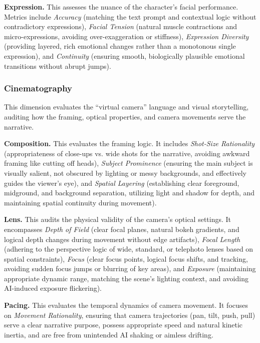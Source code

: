 \documentclass{article}
\begin{document}
\noindent
\textbf{Expression.} This assesses the nuance of the character's facial performance. Metrics include \textit{Accuracy} (matching the text prompt and contextual logic without contradictory expressions), \textit{Facial Tension} (natural muscle contractions and micro-expressions, avoiding over-exaggeration or stiffness), \textit{Expression Diversity} (providing layered, rich emotional changes rather than a monotonous single expression), and \textit{Continuity} (ensuring smooth, biologically plausible emotional transitions without abrupt jumps).

\subsubsection{Cinematography}
\noindent
This dimension evaluates the ``virtual camera'' language and visual storytelling, auditing how the framing, optical properties, and camera movements serve the narrative.

\noindent
\textbf{Composition.} This evaluates the framing logic. It includes \textit{Shot-Size Rationality} (appropriateness of close-ups vs. wide shots for the narrative, avoiding awkward framing like cutting off heads), \textit{Subject Prominence} (ensuring the main subject is visually salient, not obscured by lighting or messy backgrounds, and effectively guides the viewer's eye), and \textit{Spatial Layering} (establishing clear foreground, midground, and background separation, utilizing light and shadow for depth, and maintaining spatial continuity during movement).

\noindent
\textbf{Lens.} This audits the physical validity of the camera's optical settings. It encompasses \textit{Depth of Field} (clear focal planes, natural bokeh gradients, and logical depth changes during movement without edge artifacts), \textit{Focal Length} (adhering to the perspective logic of wide, standard, or telephoto lenses based on spatial constraints), \textit{Focus} (clear focus points, logical focus shifts, and tracking, avoiding sudden focus jumps or blurring of key areas), and \textit{Exposure} (maintaining appropriate dynamic range, matching the scene's lighting context, and avoiding AI-induced exposure flickering).

\noindent
\textbf{Pacing.} This evaluates the temporal dynamics of camera movement. It focuses on \textit{Movement Rationality}, ensuring that camera trajectories (pan, tilt, push, pull) serve a clear narrative purpose, possess appropriate speed and natural kinetic inertia, and are free from unintended AI shaking or aimless drifting.
\end{document}
